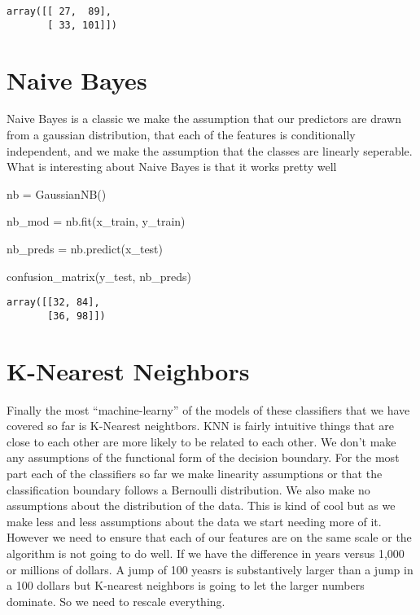 \documentclass[
  letterpaper,
  DIV=11,
  numbers=noendperiod]{scrreprt}
\newenvironment{Shaded}{\begin{snugshade}}{\end{snugshade}}
\newcommand{\NormalTok}[1]{\textcolor[rgb]{0.00,0.23,0.31}{#1}}
\newcommand{\OperatorTok}[1]{\textcolor[rgb]{0.37,0.37,0.37}{#1}}
\begin{document}
\begin{verbatim}
array([[ 27,  89],
       [ 33, 101]])
\end{verbatim}

\section{Naive Bayes}\label{naive-bayes}

Naive Bayes is a classic we make the assumption that our predictors are
drawn from a gaussian distribution, that each of the features is
conditionally independent, and we make the assumption that the classes
are linearly seperable. What is interesting about Naive Bayes is that it
works pretty well

\begin{Shaded}
\begin{Highlighting}[]
\NormalTok{nb }\OperatorTok{=}\NormalTok{ GaussianNB()}

\NormalTok{nb\_mod }\OperatorTok{=}\NormalTok{ nb.fit(x\_train, y\_train)}


\NormalTok{nb\_preds }\OperatorTok{=}\NormalTok{ nb.predict(x\_test)}

\NormalTok{confusion\_matrix(y\_test, nb\_preds)}
\end{Highlighting}
\end{Shaded}

\begin{verbatim}
array([[32, 84],
       [36, 98]])
\end{verbatim}

\section{K-Nearest Neighbors}\label{k-nearest-neighbors}

Finally the most ``machine-learny'' of the models of these classifiers
that we have covered so far is K-Nearest neightbors. KNN is fairly
intuitive things that are close to each other are more likely to be
related to each other. We don't make any assumptions of the functional
form of the decision boundary. For the most part each of the classifiers
so far we make linearity assumptions or that the classification boundary
follows a Bernoulli distribution. We also make no assumptions about the
distribution of the data. This is kind of cool but as we make less and
less assumptions about the data we start needing more of it. However we
need to ensure that each of our features are on the same scale or the
algorithm is not going to do well. If we have the difference in years
versus 1,000 or millions of dollars. A jump of 100 yeasrs is
substantively larger than a jump in a 100 dollars but K-nearest
neighbors is going to let the larger numbers dominate. So we need to
rescale everything.
\end{document}
